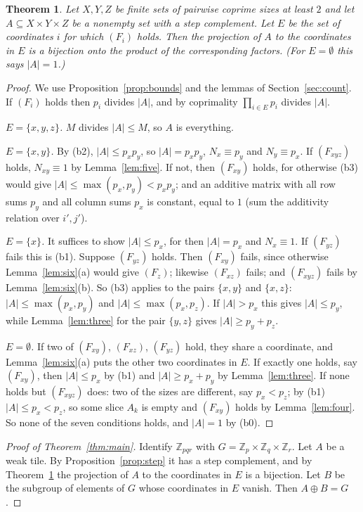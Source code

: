 \documentclass[11pt,a4paper]{amsart}
\newtheorem{theorem}{Theorem}
\theoremstyle{definition}
\theoremstyle{remark}
\newcommand{\Z}{\mathbb{Z}}
\begin{document}
\begin{theorem}\label{thm:structure}
Let $X,Y,Z$ be finite sets of pairwise coprime sizes at least $2$ and let $A\subseteq X\times Y\times Z$ be a
nonempty set with a step complement. Let $E$ be the set of coordinates $i$ for which $(F_i)$ holds. Then the
projection of $A$ to the coordinates in $E$ is a bijection onto the product of the corresponding factors. (For
$E=\emptyset$ this says $|A|=1$.)
\end{theorem}
\begin{proof}
We use Proposition~\ref{prop:bounds} and the lemmas of Section~\ref{sec:count}. If $(F_i)$ holds then $p_i$
divides $|A|$, and by coprimality $\prod_{i\in E}p_i$ divides $|A|$.

\emph{$E=\{x,y,z\}$.} $M$ divides $|A|\le M$, so $A$ is everything.

\emph{$E=\{x,y\}$.} By (b2), $|A|\le p_xp_y$, so $|A|=p_xp_y$, $N_x\equiv p_y$ and $N_y\equiv p_x$. If $(F_{xyz})$
holds, $N_{xy}\equiv1$ by Lemma~\ref{lem:five}. If not, then $(F_{xy})$ holds, for otherwise (b3) would give
$|A|\le\max(p_x,p_y)<p_xp_y$; and an additive matrix with all row sums $p_y$ and all column sums $p_x$ is
constant, equal to $1$ (sum the additivity relation over $i',j'$).

\emph{$E=\{x\}$.} It suffices to show $|A|\le p_x$, for then $|A|=p_x$ and $N_x\equiv 1$. If $(F_{yz})$ fails this
is (b1). Suppose $(F_{yz})$ holds. Then $(F_{xy})$ fails, since otherwise Lemma~\ref{lem:six}(a) would give
$(F_z)$; likewise $(F_{xz})$ fails; and $(F_{xyz})$ fails by Lemma~\ref{lem:six}(b). So (b3) applies to the pairs
$\{x,y\}$ and $\{x,z\}$: $|A|\le\max(p_x,p_y)$ and $|A|\le\max(p_x,p_z)$. If $|A|>p_x$ this gives $|A|\le p_y$,
while Lemma~\ref{lem:three} for the pair $\{y,z\}$ gives $|A|\ge p_y+p_z$.

\emph{$E=\emptyset$.} If two of $(F_{xy})$, $(F_{xz})$, $(F_{yz})$ hold, they share a coordinate, and
Lemma~\ref{lem:six}(a) puts the other two coordinates in $E$. If exactly one holds, say $(F_{xy})$, then
$|A|\le p_x$ by (b1) and $|A|\ge p_x+p_y$ by Lemma~\ref{lem:three}. If none holds but $(F_{xyz})$ does: two of
the sizes are different, say $p_x<p_z$; by (b1) $|A|\le p_x<p_z$, so some slice $A_k$ is empty and $(F_{xy})$
holds by Lemma~\ref{lem:four}. So none of the seven conditions holds, and $|A|=1$ by (b0).
\end{proof}

\begin{proof}[Proof of Theorem~\ref{thm:main}]
Identify $\Z_{pqr}$ with $G=\Z_p\times\Z_q\times\Z_r$. Let $A$ be a weak tile. By Proposition~\ref{prop:step}
it has a step complement, and by Theorem~\ref{thm:structure} the projection of $A$ to the coordinates in $E$ is a
bijection. Let $B$ be the subgroup of elements of $G$ whose coordinates in $E$ vanish. Then $A\oplus B=G$.
\end{proof}
\end{document}
